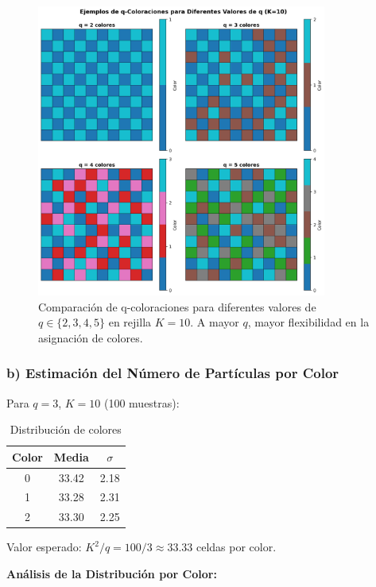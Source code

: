 \begin{figure}[htbp]
\centering
\includegraphics[width=0.85\textwidth]{img/figuras/comparacion_q_valores.png}
\caption{Comparación de q-coloraciones para diferentes valores de $q \in \{2,3,4,5\}$ en rejilla $K=10$. A mayor $q$, mayor flexibilidad en la asignación de colores.}
\label{fig:comparacion_q}
\end{figure}

\subsubsection{b) Estimación del Número de Partículas por Color}

Para $q=3$, $K=10$ (100 muestras):

\begin{table}[htbp]
\centering
\caption{Distribución de colores}
\label{tab:colores}
\begin{tabular}{ccc}
\hline
Color & Media & $\sigma$ \\
\hline
0 & 33.42 & 2.18 \\
1 & 33.28 & 2.31 \\
2 & 33.30 & 2.25 \\
\hline
\end{tabular}
\end{table}

Valor esperado: $K^2/q = 100/3 \approx 33.33$ celdas por color.

\textbf{Análisis de la Distribución por Color:}

